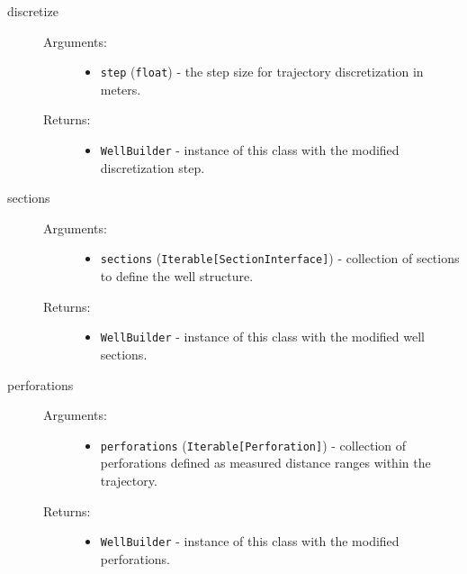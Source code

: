 \begin{description}
		\item[ \colorbox{gray!20}{discretize}] \hfill
		\begin{description}
			\item[Arguments:] \hfill
			\begin{itemize}
				\item \texttt{step} (\texttt{float}) - the step size for trajectory discretization in meters.
			\end{itemize}
			\item[Returns:] \hfill
			\begin{itemize}
				\item \texttt{WellBuilder} - instance of this class with the modified discretization step.
			\end{itemize}
		\end{description}

		\item[ \colorbox{gray!20}{sections}] \hfill
		\begin{description}
			\item[Arguments:] \hfill
			\begin{itemize}
				\item \texttt{sections} (\texttt{Iterable[SectionInterface]}) - collection of sections to define the well structure.
			\end{itemize}
			\item[Returns:] \hfill
			\begin{itemize}
				\item \texttt{WellBuilder} - instance of this class with the modified well sections.
			\end{itemize}
		\end{description}

		\item[ \colorbox{gray!20}{perforations}] \hfill
		\begin{description}
			\item[Arguments:] \hfill
			\begin{itemize}
				\item \texttt{perforations} (\texttt{Iterable[Perforation]}) - collection of perforations defined as measured distance ranges within the trajectory.
			\end{itemize}
			\item[Returns:] \hfill
			\begin{itemize}
				\item \texttt{WellBuilder} - instance of this class with the modified perforations.
			\end{itemize}
		\end{description}


\end{description}
